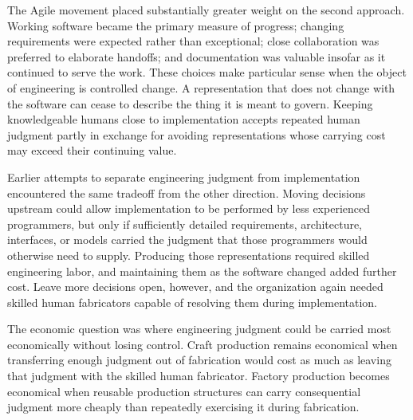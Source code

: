 The Agile movement placed substantially greater weight on the second approach\citep{agile-manifesto2001}\citep{scrumguide2020}. Working software became the primary measure of progress; changing requirements were expected rather than exceptional; close collaboration was preferred to elaborate handoffs; and documentation was valuable insofar as it continued to serve the work. These choices make particular sense when the object of engineering is controlled change. A representation that does not change with the software can cease to describe the thing it is meant to govern. Keeping knowledgeable humans close to implementation accepts repeated human judgment partly in exchange for avoiding representations whose carrying cost may exceed their continuing value.


Earlier attempts to separate engineering judgment from implementation encountered the same tradeoff from the other direction. Moving decisions upstream could allow implementation to be performed by less experienced programmers, but only if sufficiently detailed requirements, architecture, interfaces, or models carried the judgment that those programmers would otherwise need to supply. Producing those representations required skilled engineering labor, and maintaining them as the software changed added further cost. Leave more decisions open, however, and the organization again needed skilled human fabricators capable of resolving them during implementation.


The economic question was where engineering judgment could be carried most economically without losing control. Craft production remains economical when transferring enough judgment out of fabrication would cost as much as leaving that judgment with the skilled human fabricator. Factory production becomes economical when reusable production structures can carry consequential judgment more cheaply than repeatedly exercising it during fabrication.

